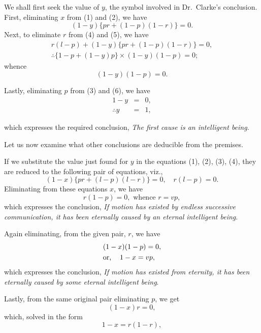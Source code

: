 \documentclass[oneside]{book}
\begin{document}
We shall first seek the value of $y$, the symbol involved in
Dr.\ Clarke's conclusion. First, eliminating $x$ from (1) and (2), we
have
\begin{equation}
(1-y) \lbrace pr + (1-p)(1-r) \rbrace = 0.
\end{equation}
Next, to eliminate $r$ from (4) and (5), we have
\begin{gather*}
r(l-p) + (1-y) \lbrace pr + (1-p)(1-r) \rbrace = 0,   \\
\therefore \lbrace 1 - p + (1-y)p \rbrace \times (1-y)(1-p) = 0;
\end{gather*}
whence
\begin{equation}
(1-y)(1-p) = 0.
\end{equation}

Lastly, eliminating $p$ from (3) and (6), we have
\begin{eqnarray*}
       1 - y &=& 0,   \\
\therefore y &=& 1,
\end{eqnarray*}

which expresses the required conclusion, \emph{The first cause is an
intelligent being}.

Let us now examine what other conclusions are deducible
from the premises.

If we substitute the value just found for $y$ in the equations
(1), (2), (3), (4), they are reduced to the following pair of equations,
viz.,
\begin{equation*}
(1-x) \lbrace pr + (l-p)(l-r) \rbrace = 0,\quad r(l-p) = 0.   \tag{7}
\end{equation*}
Eliminating from these equations $x$, we have
\begin{equation*}
r(1-p) = 0, \text{ whence }r = vp,
\end{equation*}
which expresses the conclusion, \emph{If motion has existed by endless
successive communication, it has been eternally caused by an eternal
intelligent being}.

Again eliminating, from the given pair, $r$, we have
\begin{gather*}
(1-x)(1-p) = 0,   \\
\textrm{or, }\hfill 1-x = vp,  \hfill
\end{gather*}
which expresses the conclusion, \emph{If motion has existed from eternity,
it has been eternally caused by some eternal intelligent being}.

Lastly, from the same original pair eliminating $p$, we get
\begin{equation*}
(1-x)r = 0,
\end{equation*}
which, solved in the form
\begin{equation*}
1-x = r(1-r),
\end{equation*}
\end{document}
